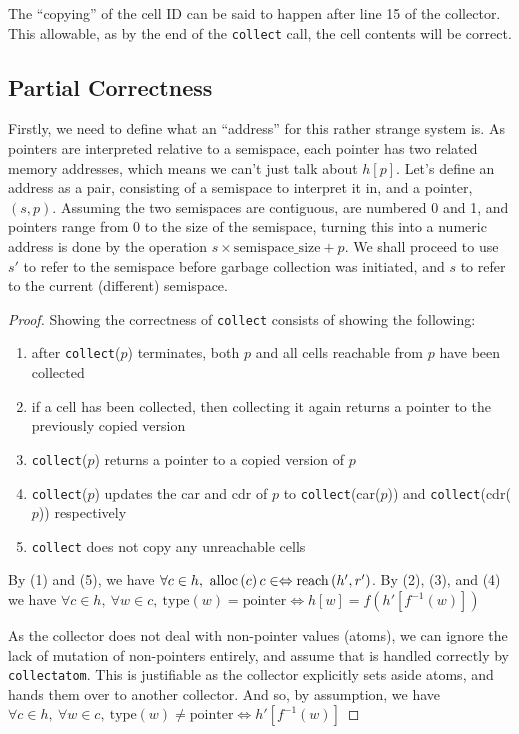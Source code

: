 The ``copying'' of the cell ID can be said to happen after line 15 of
the collector. This allowable, as by the end of the \texttt{collect}
call, the cell contents will be correct.

\subsection{Partial Correctness}
\label{sec:copying-example-partial}

Firstly, we need to define what an ``address'' for this rather strange
system is. As pointers are interpreted relative to a semispace, each
pointer has two related memory addresses, which means we can't just
talk about $h[p]$. Let's define an address as a pair, consisting of a
semispace to interpret it in, and a pointer, $(s, p)$. Assuming the
two semispaces are contiguous, are numbered 0 and 1, and pointers
range from 0 to the size of the semispace, turning this into a numeric
address is done by the operation $s \times \mathrm{semispace\_size} +
p$. We shall proceed to use $s'$ to refer to the semispace before
garbage collection was initiated, and $s$ to refer to the current
(different) semispace.

\begin{proof}
  Showing the correctness of \texttt{collect} consists of showing the
  following:

  \begin{enumerate}
  \item after \texttt{collect}($p$) terminates, both $p$ and all cells
    reachable from $p$ have been collected

  \item if a cell has been collected, then collecting it again returns
    a pointer to the previously copied version

  \item \texttt{collect}($p$) returns a pointer to a copied version of
    $p$

  \item \texttt{collect}($p$) updates the car and cdr of $p$ to
    \texttt{collect}(car($p$)) and \texttt{collect}(cdr($p$))
    respectively

  \item \texttt{collect} does not copy any unreachable cells
  \end{enumerate}

  By (1) and (5), we have $\forall c \in h,\ \alloc{c} c \in \iff
  \reach{h'}{r'}$. By (2), (3), and (4) we have $\forall c \in h,\
  \forall w \in c,\ \mathrm{type}(w) = \mathrm{pointer} \iff h[w] =
  f(h'[f^{-1}(w)])$

  As the collector does not deal with non-pointer values (atoms), we
  can ignore the lack of mutation of non-pointers entirely, and assume
  that is handled correctly by \texttt{collectatom}. This is
  justifiable as the collector explicitly sets aside atoms, and hands
  them over to another collector. And so, by assumption, we have
  $\forall c \in h,\ \forall w \in c,\ \mathrm{type}(w) \neq
  \mathrm{pointer} \iff h'[f^{-1}(w)]$
\end{proof}

